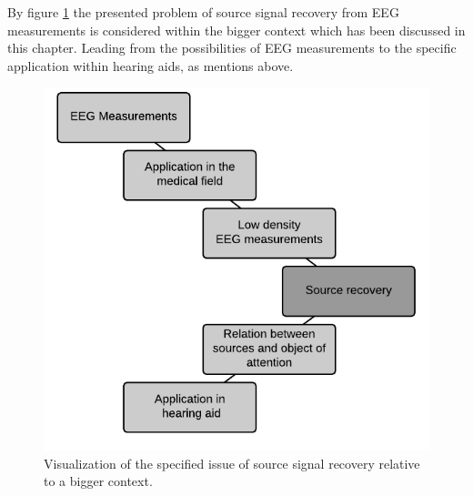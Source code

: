 By figure \ref{fig:problem} the presented problem of source signal recovery from EEG measurements is considered within the bigger context which has been discussed in this chapter. Leading from the possibilities of EEG measurements to the specific application within hearing aids, as mentions above.    
\begin{figure}[H]
\centering
\includegraphics[scale=0.85]{figures/ch_intro/system.png}
\caption{Visualization of the specified issue of source signal recovery relative to a bigger context.}
\label{fig:problem}
\end{figure}
\noindent




